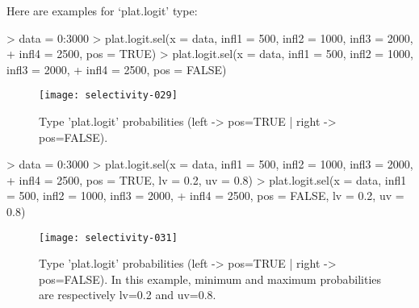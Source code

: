 \documentclass[letterpaper, 12pt]{article}
\begin{document}
\newpage

Here are examples for `plat.logit' type:
\begin{Schunk}
\begin{Sinput}
> data = 0:3000
> plat.logit.sel(x = data, infl1 = 500, infl2 = 1000, infl3 = 2000, 
+     infl4 = 2500, pos = TRUE)
> plat.logit.sel(x = data, infl1 = 500, infl2 = 1000, infl3 = 2000, 
+     infl4 = 2500, pos = FALSE)
\end{Sinput}
\end{Schunk}
\begin{figure}[h]
\vspace{-20pt}
\begin{center}
\texttt{[image: selectivity-029]}
\end{center}
\vspace{-30pt}
\caption{Type 'plat.logit' probabilities (left -> pos=TRUE |  right -> pos=FALSE).}
\vspace{-10pt}
\label{fig14}
\end{figure}


\begin{Schunk}
\begin{Sinput}
> data = 0:3000
> plat.logit.sel(x = data, infl1 = 500, infl2 = 1000, infl3 = 2000, 
+     infl4 = 2500, pos = TRUE, lv = 0.2, uv = 0.8)
> plat.logit.sel(x = data, infl1 = 500, infl2 = 1000, infl3 = 2000, 
+     infl4 = 2500, pos = FALSE, lv = 0.2, uv = 0.8)
\end{Sinput}
\end{Schunk}
\begin{figure}[h]
\vspace{-20pt}
\begin{center}
\texttt{[image: selectivity-031]}
\end{center}
\vspace{-30pt}
\caption{Type 'plat.logit' probabilities (left -> pos=TRUE |  right -> pos=FALSE). In this example, minimum and maximum probabilities are respectively lv=0.2 and uv=0.8.}
\vspace{-20pt}
\label{fig15}
\end{figure}
\end{document}
